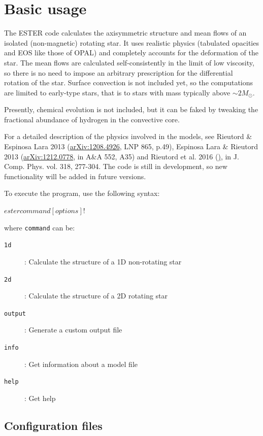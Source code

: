 \chapter{Basic usage}

The ESTER code calculates the axisymmetric structure and mean flows
of an isolated (non-magnetic) rotating star. It uses realistic physics
(tabulated opacities and EOS like those of OPAL) and completely
accounts for the deformation of the star.  The mean flows are calculated
self-consistently in the limit of low viscosity, so there is no need
to impose an arbitrary prescription for the differential rotation of
the star.  Surface convection is not included yet, so the computations
are limited to early-type stars, that is to stars with mass typically
above $\sim 2 M_\odot$.

Presently, chemical evolution is not included, but it can be faked
by tweaking the fractional abundance of hydrogen in the convective core.

For a detailed description of the physics involved
in the models, see Rieutord \& Espinosa Lara 2013
(\href{http://arxiv.org/abs/1208.4926}{arXiv:1208.4926},
LNP 865, p.49), Espinosa Lara \& Rieutord 2013
(\href{http://arxiv.org/abs/1212.0778}{arXiv:1212.0778},
in A\&A 552, A35) and Rieutord et al. 2016
(\href{http://userpages.irap.omp.eu/~mrieutord/articles/2016JCP.pdf}),
in J. Comp. Phys. vol.  318, 277-304.  The code is still in development,
so new functionality will be added in future versions.

To execute the program, use the following syntax:
\begin{shell}
    $ ester command [options]
    !$
\end{shell}
where \texttt{command} can be:
\begin{description}
    \item[{\tt 1d}]: Calculate the structure of a 1D non-rotating star
    \item[{\tt 2d}]: Calculate the structure of a 2D rotating star
    \item[{\tt output}]: Generate a custom output file
    \item[{\tt info}]: Get information about a model file
    \item[{\tt help}]: Get help
\end{description}

\section{Configuration files}

